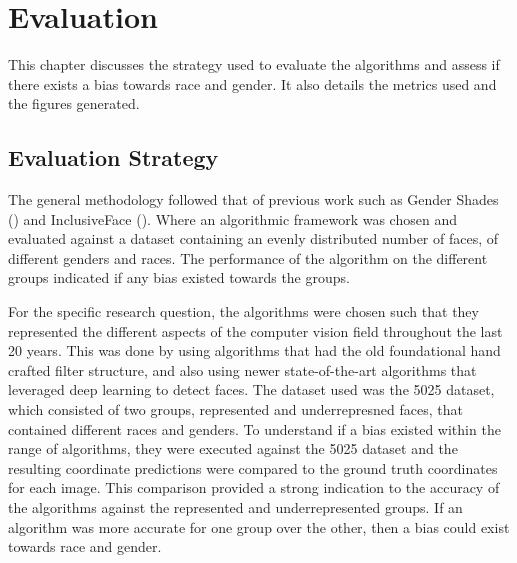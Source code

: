 \documentclass{l4proj}
\begin{document}
\chapter{Evaluation}
\label{Evaluation}

This chapter discusses the strategy used to evaluate the algorithms and assess if there exists a bias towards race and gender. It also details the metrics used and the figures generated.
\section{Evaluation Strategy}
The general methodology followed that of previous work such as Gender Shades (\cite{gendershades}) and InclusiveFace (\cite{inclusivenet}). Where an algorithmic framework was chosen and evaluated against a dataset containing an evenly distributed number of faces, of different genders and races. The performance of the algorithm on the different groups indicated if any bias existed towards the groups.

For the specific research question, the algorithms were chosen such that they represented the different aspects of the computer vision field throughout the last 20 years. This was done by using algorithms that had the old foundational hand crafted filter structure, and also using newer state-of-the-art algorithms that leveraged deep learning to detect faces. The dataset used was the 5025 dataset, which consisted of two groups, represented and underrepresned faces, that contained different races and genders. To understand if a bias existed within the range of algorithms, they were executed against the 5025 dataset and the resulting coordinate predictions were compared to the ground truth coordinates for each image. This comparison provided a strong indication to the accuracy of the algorithms against the represented and underrepresented groups. If an algorithm was more accurate for one group over the other, then a bias could exist towards race and gender.
\end{document}
